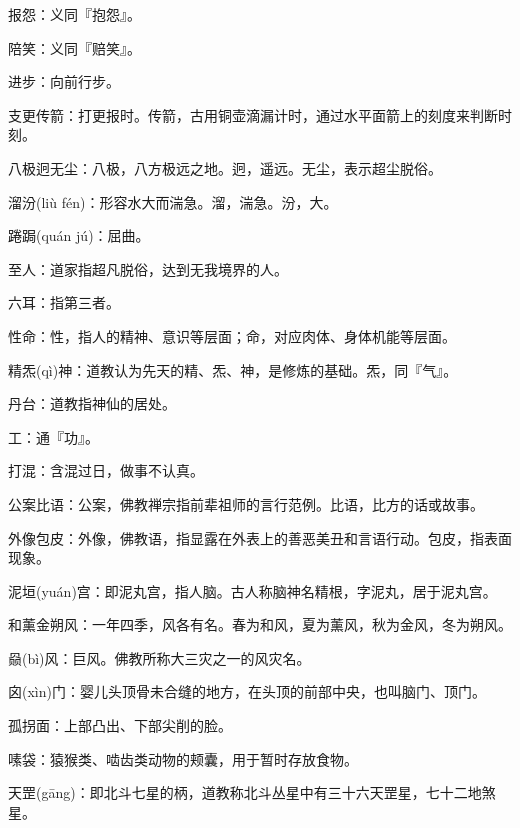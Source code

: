 \startbuffer[84]
报怨：义同『抱怨』。
\stopbuffer


\startbuffer[85]
陪笑：义同『赔笑』。
\stopbuffer


\startbuffer[86]
进步：向前行步。
\stopbuffer


\startbuffer[87]
支更传箭：打更报时。传箭，古用铜壶滴漏计时，通过水平面箭上的刻度来判断时刻。
\stopbuffer


\startbuffer[88]
八极迥无尘：八极，八方极远之地。迥，遥远。无尘，表示超尘脱俗。
\stopbuffer


\startbuffer[89]
溜汾(liù fén)：形容水大而湍急。溜，湍急。汾，大。
\stopbuffer


\startbuffer[90]
踡跼(quán jú)：屈曲。
\stopbuffer


\startbuffer[91]
至人：道家指超凡脱俗，达到无我境界的人。
\stopbuffer


\startbuffer[92]
六耳：指第三者。
\stopbuffer


\startbuffer[93]
性命：性，指人的精神、意识等层面；命，对应肉体、身体机能等层面。
\stopbuffer


\startbuffer[94]
精炁(qì)神：道教认为先天的精、炁、神，是修炼的基础。炁，同『气』。
\stopbuffer


\startbuffer[95]
丹台：道教指神仙的居处。
\stopbuffer


\startbuffer[96]
工：通『功』。
\stopbuffer


\startbuffer[97]
打混：含混过日，做事不认真。
\stopbuffer


\startbuffer[98]
公案比语：公案，佛教禅宗指前辈祖师的言行范例。比语，比方的话或故事。
\stopbuffer


\startbuffer[99]
外像包皮：外像，佛教语，指显露在外表上的善恶美丑和言语行动。包皮，指表面现象。
\stopbuffer


\startbuffer[100]
泥垣(yuán)宫：即泥丸宫，指人脑。古人称脑神名精根，字泥丸，居于泥丸宫。
\stopbuffer


\startbuffer[101]
和薰金朔风：一年四季，风各有名。春为和风，夏为薰风，秋为金风，冬为朔风。
\stopbuffer


\startbuffer[102]
赑(bì)风：巨风。佛教所称大三灾之一的风灾名。
\stopbuffer


\startbuffer[103]
囟(xìn)门：婴儿头顶骨未合缝的地方，在头顶的前部中央，也叫脑门、顶门。
\stopbuffer


\startbuffer[104]
孤拐面：上部凸出、下部尖削的脸。
\stopbuffer


\startbuffer[105]
嗉袋：猿猴类、啮齿类动物的颊囊，用于暂时存放食物。
\stopbuffer


\startbuffer[106]
天罡(gāng)：即北斗七星的柄，道教称北斗丛星中有三十六天罡星，七十二地煞星。
\stopbuffer


